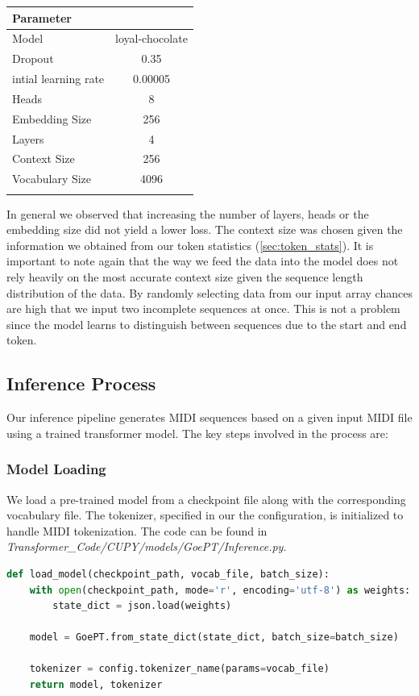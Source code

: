 \documentclass[a4paper,12pt]{extarticle}
\begin{document}
\begin{center}
    \begin{tabular}{lc}
  \toprule
  \textbf{Parameter} &  \\
  \midrule
  Model & loyal-chocolate \\
  Dropout & 0.35 \\
  intial learning rate & 0.00005 \\
  Heads  & 8 \\
  Embedding Size  & 256 \\
  Layers  & 4 \\
  Context Size & 256 \\
  Vocabulary Size & 4096 \\
  \bottomrule
  \label{tab:parameters}
\end{tabular}
\end{center}
In general we observed that increasing the number of layers, heads or the embedding size did not yield a lower loss.
The context size was chosen given the information we obtained from our token statistics (\ref{sec:token_stats}).
It is important to note again that the way we feed the data into the model does not rely heavily on the most accurate context size given the sequence length distribution of the data.
By randomly selecting data from our input array chances are high that we input two incomplete sequences at once. This is not a problem since the model learns to distinguish between sequences due to the start and end token.


\subsection{Inference Process}

Our inference pipeline generates MIDI sequences based on a given input MIDI file using a trained transformer model. The key steps involved in the process are:

\subsubsection{Model Loading}
We load a pre-trained model from a checkpoint file along with the corresponding vocabulary file. The tokenizer, specified in our the configuration, is initialized to handle MIDI tokenization. The code can be found in \textit{Transformer\_Code/CUPY/models/GoePT/Inference.py}.
\begin{lstlisting}[language=Python, caption=Loading the pre-trained model and tokenizer]
def load_model(checkpoint_path, vocab_file, batch_size):
    with open(checkpoint_path, mode='r', encoding='utf-8') as weights:
        state_dict = json.load(weights)

    model = GoePT.from_state_dict(state_dict, batch_size=batch_size)
    
    tokenizer = config.tokenizer_name(params=vocab_file)
    return model, tokenizer
\end{lstlisting}
\end{document}
